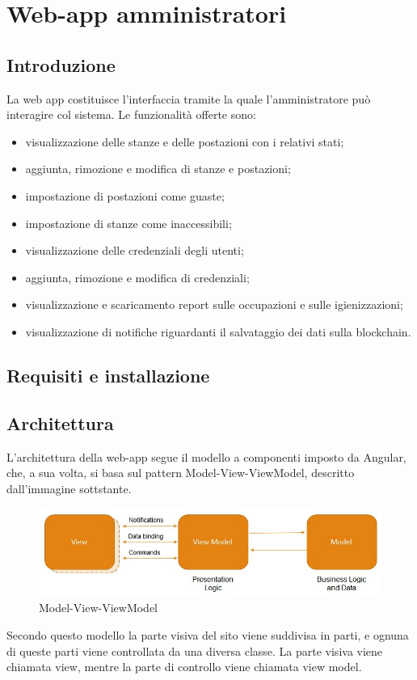 \section{Web-app amministratori}
\subsection{Introduzione}
La web app costituisce l'interfaccia tramite la quale l'amministratore può interagire col sistema.
Le funzionalità offerte sono:
\begin{itemize}
	\item visualizzazione delle stanze e delle postazioni con i relativi stati;
	\item aggiunta, rimozione e modifica di stanze e postazioni;
	\item impostazione di postazioni come guaste;
	\item impostazione di stanze come inaccessibili;
	\item visualizzazione delle credenziali degli utenti;
	\item aggiunta, rimozione e modifica di credenziali;
	\item visualizzazione e scaricamento report sulle occupazioni e sulle igienizzazioni;
	\item visualizzazione di notifiche riguardanti il salvataggio dei dati sulla blockchain.
\end{itemize}

\subsection{Requisiti e installazione}

\subsection{Architettura}
L'architettura della web-app segue il modello a componenti imposto da Angular, che, a sua volta, si basa sul pattern Model-View-ViewModel, descritto dall'immagine sottstante.
\begin{figure}[H]
	\centering
	\includegraphics[width=15cm]{res/images/mvvm.jpg}
	\caption{Model-View-ViewModel}
	\label{fig:Model-View-ViewModel}
\end{figure}
Secondo questo modello la parte visiva del sito viene suddivisa in parti, e ognuna di queste parti viene controllata da una diversa classe.
La parte visiva viene chiamata view, mentre la parte di controllo viene chiamata view model.




